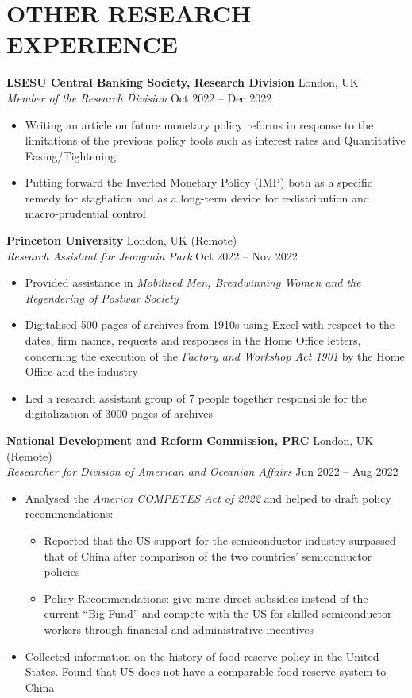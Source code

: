 \documentclass[a4paper,9pt]{extarticle}
\begin{document}
\section*{OTHER RESEARCH EXPERIENCE}
\noindent
\textbf{LSESU Central Banking Society, Research Division} \hfill London, UK\\ %
\textit{Member of the Research Division} \hfill Oct 2022 – Dec 2022 %
\begin{itemize}
    \item Writing an article on future monetary policy reforms in response to the limitations of the previous policy tools such as interest rates and Quantitative Easing/Tightening
    \item Putting forward the Inverted Monetary Policy (IMP) both as a specific remedy for stagflation and as a long-term device  for redistribution and macro-prudential control
\end{itemize}
\noindent
\textbf{Princeton University} \hfill London, UK (Remote) \\
\textit{Research Assistant for Jeongmin Park} \hfill Oct 2022 – Nov 2022 %
\begin{itemize}
    \item Provided assistance in \textit{Mobilised Men, Breadwinning Women and the Regendering of Postwar Society}
    \item Digitalised 500 pages of archives from 1910s using Excel with respect to the dates, firm names, requests and responses in the Home Office letters, concerning the execution of the \textit{Factory and Workshop Act 1901} by the Home Office and the industry
    \item Led a research assistant group of 7 people together responsible for the digitalization of 3000 pages of archives
\end{itemize}
\noindent
\textbf{National Development and Reform Commission, PRC } \hfill London, UK (Remote) \\
\textit{Researcher for Division of American and Oceanian Affairs} \hfill Jun 2022 – Aug 2022 %
\begin{itemize}
    \item Analysed the \textit{America COMPETES Act of 2022} and helped to draft policy recommendations:
    \begin{itemize}
        \item Reported that the US support for the semiconductor industry surpassed that of China after comparison of the two countries’ semiconductor policies
        \item Policy Recommendations: give more direct subsidies instead of the current “Big Fund” and compete with the US for skilled semiconductor workers through financial and administrative incentives
    \end{itemize}
    \item Collected information on the history of food reserve policy in the United States. Found that US does not have a comparable food reserve system to China
\end{itemize}
\end{document}
